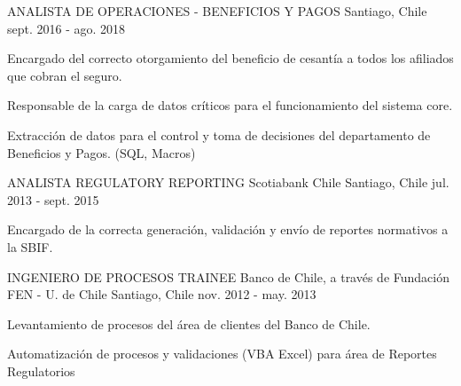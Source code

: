 \begin{cventries}
  \cventry
    {ANALISTA DE OPERACIONES - BENEFICIOS Y PAGOS} %
    {} %
    {Santiago, Chile} %
    {sept. 2016 - ago. 2018} %
    {
      \begin{cvitems} %
        \item {Encargado del correcto otorgamiento del beneficio de cesantía a todos los afiliados que cobran el seguro.}
        \item {Responsable de la carga de datos críticos para el funcionamiento del sistema core.}
        \item {Extracción de datos para el control y toma de decisiones del departamento de Beneficios y Pagos. (SQL, Macros)}
      \end{cvitems}
    }

  \cventry
    {ANALISTA REGULATORY REPORTING} %
    {Scotiabank Chile} %
    {Santiago, Chile} %
    {jul. 2013 - sept. 2015} %
    {
      \begin{cvitems} %
        \item {Encargado de la correcta generación, validación y envío de reportes normativos a la SBIF.}
      \end{cvitems}
    }



\cventry
  {INGENIERO DE PROCESOS TRAINEE} %
  {Banco de Chile, a través de Fundación FEN - U. de Chile} %
  {Santiago, Chile} %
  {nov. 2012 - may. 2013} %
  {
    \begin{cvitems} %
      \item {Levantamiento de procesos del área de clientes del Banco de Chile.}
      \item {Automatización de procesos y validaciones (VBA Excel) para área de Reportes Regulatorios}
    \end{cvitems}
  }

\end{cventries}
